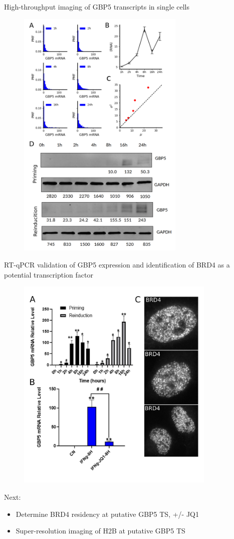 \documentclass{beamer}					%
\begin{document}
\begin{frame}{High-throughput imaging of GBP5 transcripts in single cells}
\begin{figure}
\includegraphics[width=8cm]{Figure-3.png}
\end{figure}
\end{frame}

\begin{frame}{RT-qPCR validation of GBP5 expression and identification of BRD4 as a potential transcription factor}
\begin{figure}
\includegraphics[width=9.5cm]{Figure-4.png}
\end{figure}
Next:
\begin{itemize}
\item Determine BRD4 residency at putative GBP5 TS, +/- JQ1
\item Super-resolution imaging of H2B at putative GBP5 TS
\end{itemize}
\end{frame}
\end{document}
